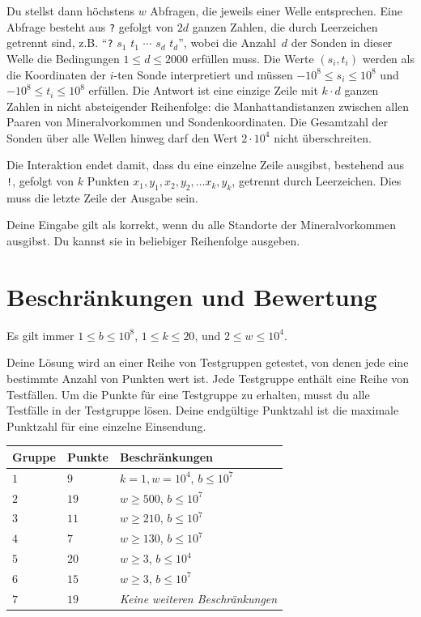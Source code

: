 Du stellst dann höchstens $w$ Abfragen, die jeweils einer Welle entsprechen.
Eine Abfrage besteht aus \texttt{?} gefolgt von $2d$ ganzen Zahlen, die durch Leerzeichen getrennt sind, z.B. ``\texttt{?} $s_1$ $t_1$ $\cdots$ $s_d$ $t_d$'', wobei die Anzahl~$d$ der Sonden in dieser Welle die Bedingungen
$1\leq d\leq 2000$ %
erfüllen muss.
Die Werte $(s_i,t_i)$ werden als die Koordinaten der $i$-ten Sonde interpretiert und müssen
$-10^8 \leq s_i \leq 10^8$ und $-10^8 \leq t_i \leq 10^8$ %
erfüllen.
Die Antwort ist eine einzige Zeile mit $k \cdot d$ ganzen Zahlen in nicht absteigender Reihenfolge: die Manhattandistanzen zwischen allen Paaren von Mineralvorkommen und Sondenkoordinaten.
Die Gesamtzahl der Sonden über alle Wellen hinweg darf den Wert
$2\cdot 10^4$ %
nicht überschreiten.

Die Interaktion endet damit, dass du eine einzelne Zeile ausgibst, bestehend aus \texttt{!}, gefolgt von $k$ Punkten $x_1, y_1, x_2, y_2, \ldots x_k, y_k$, getrennt durch Leerzeichen.
Dies muss die letzte Zeile der Ausgabe sein.

Deine Eingabe gilt als korrekt, wenn du alle Standorte der Mineralvorkommen ausgibst.
Du kannst sie in beliebiger Reihenfolge ausgeben.

\section*{Beschränkungen und Bewertung}

Es gilt immer
$1\leq b \leq 10^8$, %
$1 \leq k \leq 20$, %
und
$2 \le w \le 10^4$. %

Deine Lösung wird an einer Reihe von Testgruppen getestet, von denen jede eine bestimmte Anzahl von Punkten wert ist.
Jede Testgruppe enthält eine Reihe von Testfällen.
Um die Punkte für eine Testgruppe zu erhalten, musst du alle Testfälle in der Testgruppe lösen.
Deine endgültige Punktzahl ist die maximale Punktzahl für eine einzelne Einsendung.

\medskip
\begin{tabular}{lll}
Gruppe & Punkte & Beschränkungen \\\hline
  $1$ & $9$ & $k = 1, w = 10^4$, $b \le 10^7$\\
  $2$ & $19$ & $w \ge 500$, $b \le 10^7$\\
  $3$ & $11$ & $w \ge 210$, $b \le 10^7$\\
  $4$ & $7$ & $w \ge 130$, $b \le 10^7$\\
  $5$ & $20$ & $w \ge 3$, $b \le 10^4$\\
  $6$ & $15$ & $w \ge 3$, $b \le 10^7$\\
  $7$ & $19$ & \emph{Keine weiteren Beschränkungen}
\end{tabular}

